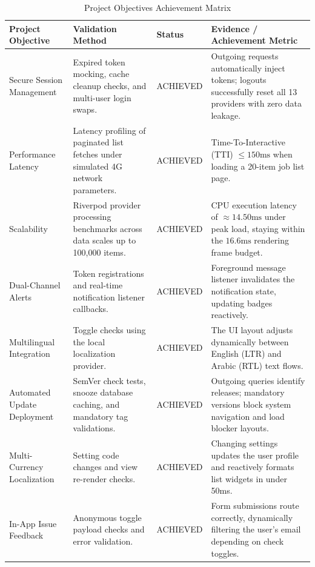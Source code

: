 \begin{table}[htbp]
\centering
\caption{Project Objectives Achievement Matrix}
\label{tab:objectives_validation}
\begin{tabular}{|p{3cm}|p{3.5cm}|l|p{4cm}|}
\hline
\textbf{Project Objective} & \textbf{Validation Method} & \textbf{Status} & \textbf{Evidence / Achievement Metric} \\ \hline
Secure Session Management & Expired token mocking, cache cleanup checks, and multi-user login swaps. & ACHIEVED & Outgoing requests automatically inject tokens; logouts successfully reset all 13 providers with zero data leakage. \\ \hline
Performance Latency & Latency profiling of paginated list fetches under simulated 4G network parameters. & ACHIEVED & Time-To-Interactive (TTI) $\le 150\text{ms}$ when loading a 20-item job list page. \\ \hline
Scalability & Riverpod provider processing benchmarks across data scales up to 100,000 items. & ACHIEVED & CPU execution latency of $\approx 14.50\text{ms}$ under peak load, staying within the $16.6\text{ms}$ rendering frame budget. \\ \hline
Dual-Channel Alerts & Token registrations and real-time notification listener callbacks. & ACHIEVED & Foreground message listener invalidates the notification state, updating badges reactively. \\ \hline
Multilingual Integration & Toggle checks using the local localization provider. & ACHIEVED & The UI layout adjusts dynamically between English (LTR) and Arabic (RTL) text flows. \\ \hline
Automated Update Deployment & SemVer check tests, snooze database caching, and mandatory tag validations. & ACHIEVED & Outgoing queries identify releases; mandatory versions block system navigation and load blocker layouts. \\ \hline
Multi-Currency Localization & Setting code changes and view re-render checks. & ACHIEVED & Changing settings updates the user profile and reactively formats list widgets in under 50ms. \\ \hline
In-App Issue Feedback & Anonymous toggle payload checks and error validation. & ACHIEVED & Form submissions route correctly, dynamically filtering the user's email depending on check toggles. \\ \hline
\end{tabular}
\end{table}

